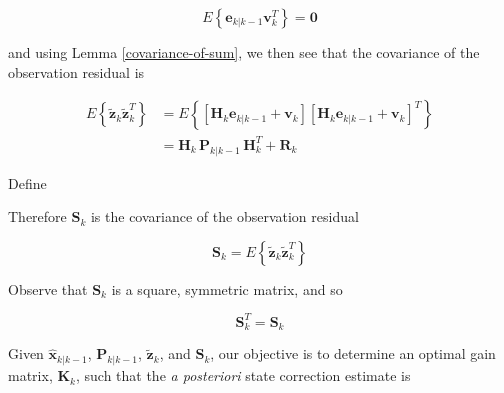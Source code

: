 \documentclass[12pt]{article}
\begin{document}
\begin{equation*}
    E \left\{ \mathbf{e}_{k|k-1} \mathbf{v}_k^T \right\} = \mathbf{0}
\end{equation*}

and using Lemma \ref{covariance-of-sum}, we then see that the covariance of the
observation residual is

\begin{equation*}
    \begin{aligned}
        E \left\{ \tilde{\mathbf{z}}_k \tilde{\mathbf{z}}_k^T \right\}
        &= E \left\{ \left[ \mathbf{H}_k \mathbf{e}_{k|k-1} + \mathbf{v}_k \right] \left[ \mathbf{H}_k \mathbf{e}_{k|k-1} + \mathbf{v}_k \right]^T \right\} \\
        &= \mathbf{H}_{k} \, \mathbf{P}_{k|k-1} \, \mathbf{H}_{k}^T + \mathbf{R}_{k}
    \end{aligned}
\end{equation*}

Define


Therefore $\mathbf{S}_k$ is the covariance of the observation residual

\begin{equation*}
    \mathbf{S}_k = E \left\{ \tilde{\mathbf{z}}_k \tilde{\mathbf{z}}_k^T \right\}
\end{equation*}

Observe that $\mathbf{S}_k$ is a square, symmetric matrix, and so

\begin{equation*}
    \mathbf{S}_k^T = \mathbf{S}_k
\end{equation*}

Given $\hat{\mathbf{x}}_{k|k-1}$, $\mathbf{P}_{k|k-1}$, $\tilde{\mathbf{z}}_k$, and
$\mathbf{S}_k$, our objective is to determine an optimal gain matrix, $\mathbf{K}_k$,
such that the \textit{a posteriori} state correction estimate is

\end{document}
